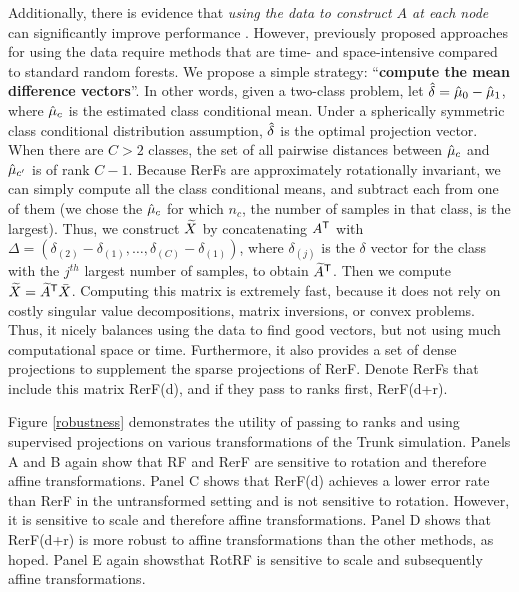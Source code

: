 \documentclass[10pt]{article}
\begin{document}
Additionally, there is evidence that {\em{using the data to construct $A$ at each node}} can significantly improve performance \cite{Heath1993}. However, previously proposed approaches for using the data require methods that are time- and space-intensive compared to standard random forests.  We propose a simple strategy: ``{\bf{compute the mean difference vectors}}''. In other words, given a two-class problem, let $\hat{\delta}=\hat{\mu}_0-\hat{\mu}_1$, where $\hat{\mu}_c$ is the estimated class conditional mean. Under a spherically symmetric class conditional distribution assumption, $\hat{\delta}$ is the optimal projection vector. When there are $C>2$ classes, the set of all pairwise distances between $\hat{\mu}_c$ and $\hat{\mu}_{c'}$ is of rank $C-1$. Because RerFs are approximately rotationally invariant, we can simply compute all the class conditional means, and subtract each from one of them (we chose the $\hat{\mu}_c$ for which $n_c$, the number of samples in that class, is the largest). Thus, we construct $\widetilde{X}$ by concatenating $A^{\mathsf{T}}$ with $\Delta=(\delta_{(2)} - \delta_{(1)}, \ldots, \delta_{(C)} - \delta_{(1)})$, where $\delta_{(j)}$ is the $\delta$ vector for the class with the $j^{th}$ largest number of samples, to obtain $\widetilde{A}^{\mathsf{T}}$. Then we compute $\widetilde{X} = \widetilde{A}^{\mathsf{T}}\bar{X}$. Computing this matrix is extremely fast, because it does not rely on costly singular value decompositions, matrix inversions, or convex problems. Thus, it nicely balances using the data to find good vectors, but not using much computational space or time. Furthermore, it also provides a set of dense projections to supplement the sparse projections of RerF. Denote RerFs that include this matrix RerF(d), and if they pass to ranks first, RerF(d+r). 


Figure \ref{robustness} demonstrates the utility of passing to ranks and using supervised projections on various transformations of the Trunk simulation. Panels A and B again show that RF and RerF are sensitive to rotation and therefore affine transformations. Panel C shows that RerF(d) achieves a lower error rate than RerF in the untransformed setting and is not sensitive to rotation. However, it is sensitive to scale and therefore affine transformations. Panel D shows that RerF(d+r) is more robust to affine transformations than the other methods, as hoped. Panel E again showsthat RotRF is sensitive to scale and subsequently affine transformations.
\end{document}
